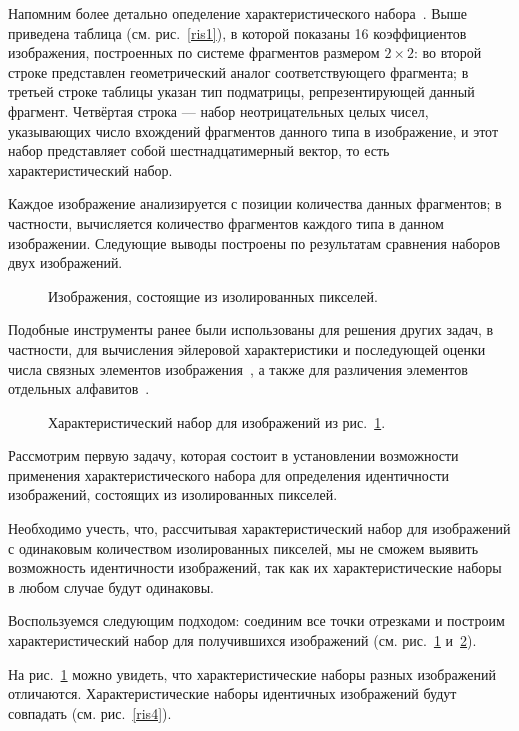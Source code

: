 \documentclass{csmathnotes}
\begin{document}
Напомним более детально опеделение характеристического набора~\cite{3}. Выше приведена таблица (см. рис.~\ref{ris1}), в которой показаны 16 коэффициентов изображения, построенных по системе фрагментов размером $2\times2$: во второй строке представлен геометрический аналог соответствующего фрагмента; в третьей строке таблицы указан тип подматрицы, репрезентирующей данный фрагмент. Четвёртая строка — набор неотрицательных целых чисел, указывающих число вхождений фрагментов данного типа в изображение, и этот набор представляет собой шестнадцатимерный вектор, то есть характеристический набор.

Каждое изображение анализируется с позиции количества данных фрагментов; в частности, вычисляется количество фрагментов каждого типа в данном изображении. Следующие выводы построены по результатам сравнения наборов двух изображений.

\begin{figure}[h!]
	\caption{Изображения, состоящие из изолированных пикселей.}
	\label{ris2}
\end{figure}

Подобные инструменты ранее были использованы для решения других задач, в частности, для вычисления эйлеровой характеристики и последующей оценки числа связных элементов изображения~\cite{6}, а также для различения элементов отдельных алфавитов~\cite{2}. 

\begin{figure}[h!]
	\caption{Характеристический набор для изображений из рис.~\ref{ris2}.}
	\label{ris3}
\end{figure}

Рассмотрим первую задачу, которая состоит в установлении возможности применения характеристического набора для определения идентичности изображений, состоящих из изолированных пикселей.

Необходимо учесть, что, рассчитывая характеристический набор для изображений с одинаковым количеством изолированных пикселей, мы не сможем выявить возможность идентичности изображений, так как их характеристические наборы в любом случае будут одинаковы.

Воспользуемся следующим подходом: соединим все точки отрезками и построим характеристический набор для получившихся изображений (см. рис.~\ref{ris2} и~\ref{ris3}).

На рис.~\ref{ris2} можно увидеть, что характеристические наборы разных изображений отличаются. Характеристические наборы идентичных изображений будут совпадать (см. рис.~\ref{ris4}).
\end{document}
